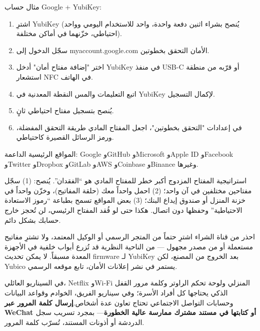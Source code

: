 
مثال حساب Google + YubiKey:

\begin{enumerate}
  \item اشترِ YubiKey (يُنصح بشراء اثنين دفعة واحدة، واحد للاستخدام اليومي وواحد احتياطي، خزّنهما في أماكن مختلفة).
  \item سجّل الدخول إلى myaccount.google.com الأمان التحقق بخطوتين.
  \item اختر "إضافة مفتاح أمان" أدخل YubiKey في منفذ USB-C أو قرّبه من منطقة استشعار NFC في الهاتف.
  \item اتبع التعليمات والمس النقطة المعدنية في YubiKey لإكمال التسجيل.
  \item يُنصح بتسجيل مفتاح احتياطي ثانٍ.
  \item في إعدادات "التحقق بخطوتين"، اجعل المفتاح المادي طريقة التحقق المفضلة، ورمز الرسائل القصيرة كاحتياطي.
\end{enumerate}

المواقع الرئيسية الداعمة: Google وGitHub وMicrosoft وApple ID وFacebook وTwitter وDropbox وGitLab وAWS وCoinbase وBinance وغيرها.

\begin{tcbinfo}{استراتيجية المفتاح المزدوج}
أكبر خطر للمفتاح المادي هو “الفقدان”. يُنصح: (1) سجّل مفتاحين مختلفين في آن واحد؛ (2) احمل واحداً معك (حلقة المفاتيح)، وخزّن واحداً في خزنة المنزل أو صندوق إيداع البنك؛ (3) بعض المواقع تسمح بطباعة “رموز الاستعادة الاحتياطية” وحفظها دون اتصال. هكذا حتى لو فُقد المفتاح الرئيسي، لن تُحجز خارج حسابك بشكل دائم.

\end{tcbinfo}

\begin{tcbwarn}{احذر من قناة الشراء}
اشترِ حتماً من المتجر الرسمي أو الوكيل المعتمد، ولا تشترِ مفاتيح مستعملة أو من مصدر مجهول — من الناحية النظرية قد تُزرع أبواب خلفية في الأجهزة المعدة مسبقاً. لا يمكن تحديث firmware لـ YubiKey بعد الخروج من المصنع، لكن Yubico يستمر في نشر إعلانات الأمان، تابع موقعه الرسمي.

\end{tcbwarn}


في السيناريو العائلي، Netflix وWi-Fi المنزلي ولوحة تحكم الراوتر وكلمة مرور القفل الذكي يحتاجها كل أفراد الأسرة؛ وفي سيناريو الفريق، الخوادم وقواعد البيانات وحسابات التواصل الاجتماعي تحتاج تعاون عدة أشخاص.\textbf{إرسال كلمة المرور عبر WeChat أو كتابتها في مستند مشترك ممارسة عالية الخطورة}— بمجرد تسريب سجل الدردشة أو أذونات المستند، تُسرّب كلمة المرور.

